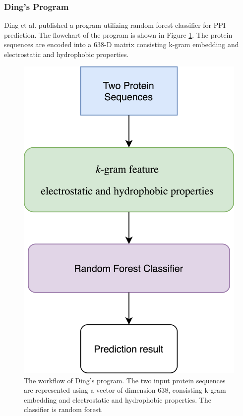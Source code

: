 \subsubsection{Ding's Program}
Ding et al. \cite{ding2016predicting} published a program utilizing random forest classifier for PPI prediction. The flowchart of the program is shown in Figure \ref{fig_Ding}. The protein sequences are encoded into a 638-D matrix consisting k-gram embedding and electrostatic and hydrophobic properties.
\begin{figure}[h!]
\begin{center}
\includegraphics[height =7 cm]{img/Ding.png}
\caption[The workflow of Ding's program]{The workflow of Ding's program. The two input protein sequences are represented using a vector of dimension 638, consisting k-gram embedding and electrostatic and hydrophobic properties. The classifier is random forest. \label{fig_Ding}}
\end{center}
\end{figure} 
